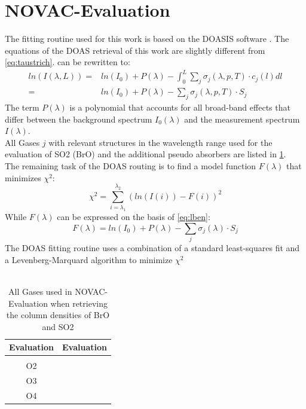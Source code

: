 \documentclass  [
  paper    = a4,
  BCOR     = 10mm,
  twoside,
  fontsize = 12pt,
  fleqn,
  toc      = bibnumbered,
  toc      = listofnumbered,
  numbers  = noendperiod,
  headings = normal,
  listof   = leveldown,
  version  = 3.03
]                                       {scrreprt}
\begin{document}
	\section{NOVAC-Evaluation}
		The fitting routine used for this work is based on the DOASIS software \cite{kraus2006doasis}. 
		The equations of the DOAS retrieval of this work are slightly different from \cref{eq:taustrich}.
		 can be rewritten to:
		\begin{align}
		ln\left(I\left(\lambda, L\right)\right) = &ln\left(I_0 \right) + P \left(\lambda\right) -	\int_{0}^{L}\sum_{j}\sigma_j \left(\lambda, p, T \right) \cdot c_j \left(l\right)dl \nonumber \\
		= &ln\left(I_0 \right) + P \left(\lambda\right)-
		\sum_{j}\sigma_j \left(\lambda, p, T \right) \cdot S_j
		\label{eq:lben}
		\end{align}
		The term $ P \left(\lambda\right)$ is a polynomial that accounts for all broad-band effects that differ between the background spectrum $I_0\left(\lambda\right)$ and the measurement spectrum $I\left(\lambda\right)$.\\
		All Gases $j$ with relevant structures in the wavelength range used for the evaluation of SO2 (BrO) and the additional pseudo absorbers are listed in \cref{tab:gases}.\\
		The remaining task of the DOAS routing is to find a model function $F \left(\lambda\right)$ that minimizes $\chi^2$:
		\begin{equation}
		\chi^2 = \sum_{i=\lambda_1}^{\lambda_2}\left(ln(I(i))-F(i)\right)^2
		\end{equation}
		While $F\left(\lambda\right)$ can be expressed on the basis of \cref{eq:lben}:
		\begin{equation}
		F\left(\lambda\right) = ln\left(I_0 \right) + P \left(\lambda\right)-
		\sum_{j}\sigma_j \left(\lambda\right) \cdot S_j
		\end{equation}
	The DOAS fitting routine uses a combination of a standard least-squares fit and a Levenberg-Marquard algorithm to minimize $\chi^2$\\
	\\
	\begin{table}
		\begin{tabular}[|p{2cm}|p{2.5cm}|]{cc}
			\ce{BrO} Evaluation&\ce{SO2} Evaluation\\
			\toprule
			\ce{SO2}&\\
			O2&\\
			O3&\\
			O4&\\
			\bottomrule		
			\end{tabular}
			\label{tab:gases}
			\caption{All Gases used in NOVAC- Evaluation when retrieving the column densities of BrO and SO2}
		\end{table}
	
\end{document}
